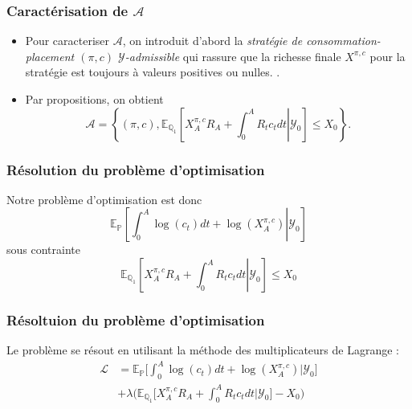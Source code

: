 \documentclass{beamer}
\begin{document}
\begin{frame}
\frametitle{Caractérisation de $\mathcal{A}$}
\begin{itemize}
\item Pour caracteriser $\mathcal{A}$, on introduit d'abord la \textit{stratégie de consommation-placement $(\pi, c)$ $ \mathcal{Y}$-admissible} qui rassure que la richesse finale $X^{\pi, c}$ pour la stratégie est toujours à valeurs positives ou nulles. .
\item Par propositions, on obtient 
\begin{equation*}
\mathcal{A} = \left\lbrace \left( \pi, c \right), \mathbb{E}_{\mathbb{Q}_1} \left[ X_A^{\pi, c} R_A + \int_0^A R_t c_t dt \left\vert\right. \mathcal{Y}_0 \right] \leq X_0 \right\rbrace .
\end{equation*}
\end{itemize}
\end{frame}

\begin{frame}
\frametitle{Résolution du problème d'optimisation}
Notre problème d'optimisation est donc 
\begin{equation*}
\mathbb{E}_{\mathbb{P}} \left[ \int_0^A \log  \left( c_t \right) dt + \log \left( X_A^{\pi, c}\right) \left\vert\right. \mathcal{Y}_0 \right]
\end{equation*}
sous contrainte 
\begin{equation*}
\mathbb{E}_{\mathbb{Q}_1} \left[ X_A^{\pi, c} R_A + \int_0^A R_t c_t dt \left\vert\right. \mathcal{Y}_0 \right] \leq X_0
\end{equation*}
\end{frame}

\begin{frame}
\frametitle{Résoltuion du problème d'optimisation}
Le problème se résout en utilisant la méthode des multiplicateurs de Lagrange :
\begin{align*}
\mathcal{L} &= \mathbb{E}_{\mathbb{P}} \big[ \int_{0}^{A} \log (c_t) dt + \log (X^{\pi, c}_A ) | \mathcal{Y}_0 \big] \\
&+ \lambda \Big( \mathbb{E}_{\mathbb{Q}_1} \big[ X^{\pi, c}_A R_A + \int_{0}^{A} R_t c_t dt | \mathcal{Y}_0 \big] - X_0 \Big)
\end{align*}

\end{frame}
\end{document}
